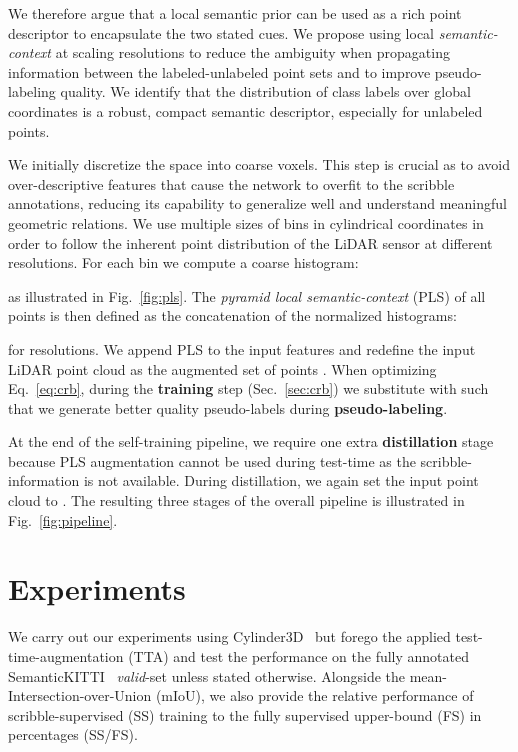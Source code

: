 \documentclass[10pt,twocolumn,letterpaper]{article}
\begin{document}
We therefore argue that a local semantic prior can be used as a rich point descriptor to encapsulate the two stated cues. We propose using local \textit{semantic-context} at scaling resolutions to reduce the ambiguity when propagating information between the labeled-unlabeled point sets and to improve pseudo-labeling quality. 
We identify that the distribution of class labels over global coordinates is a robust, compact semantic descriptor, especially for unlabeled points.

We initially discretize the space into coarse voxels. This step is crucial as to avoid over-descriptive features that cause the network to overfit to the scribble annotations, reducing its capability to generalize well and understand meaningful geometric relations. We use multiple sizes of bins in cylindrical coordinates in order to follow the inherent point distribution of the LiDAR sensor at different resolutions. For each bin  we compute a coarse histogram: \vspace{-5px}

as illustrated in Fig.~\ref{fig:pls}. The \textit{pyramid local semantic-context} (PLS) of all points  is then defined as the concatenation of the normalized histograms:

for  resolutions. We append PLS to the input features and redefine the input LiDAR point cloud as the augmented set of points . When optimizing Eq.~\ref{eq:crb}, during the \textbf{training} step (Sec.~\ref{sec:crb}) we substitute  with  such that we generate better quality pseudo-labels during \textbf{pseudo-labeling}. 

At the end of the self-training pipeline, we require one extra \textbf{distillation} stage because PLS augmentation cannot be used during test-time as the scribble-information is not available. During distillation, we again set the input point cloud to . The resulting three stages of the overall pipeline is illustrated in Fig.~\ref{fig:pipeline}.

\section{Experiments}

We carry out our experiments using Cylinder3D~\cite{cvpr2021cylindrical} but forego the applied test-time-augmentation (TTA) and test the performance on the fully annotated SemanticKITTI~\cite{iccv2019semantickitti} \textit{valid}-set unless stated otherwise. Alongside the mean-Intersection-over-Union (mIoU), we also provide the relative performance of scribble-supervised (SS) training to the fully supervised upper-bound (FS) in percentages (SS/FS).
\end{document}
